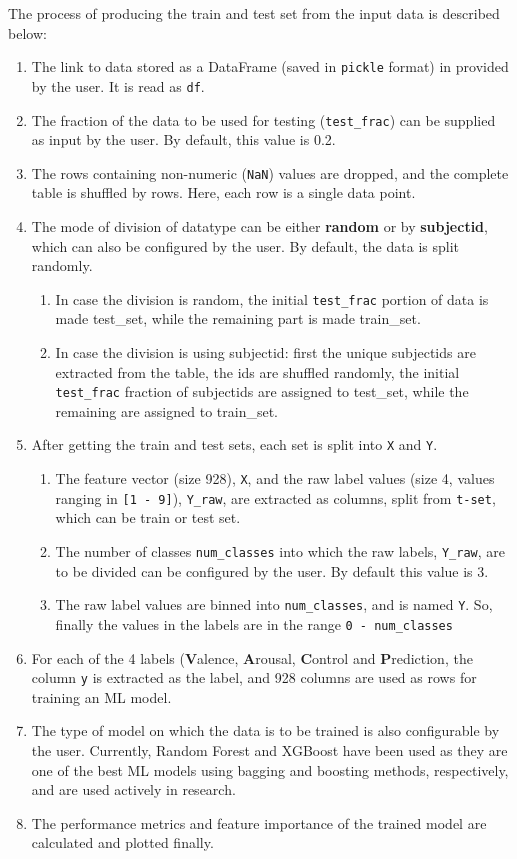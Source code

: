 The process of producing the train and test set from the input data is described below:
\begin{enumerate}
    \item The link to data stored as a DataFrame (saved in \texttt{pickle} format) in provided by the user. It is read as \texttt{df}.
    \item The fraction of the data to be used for testing (\texttt{test\_frac}) can be supplied as input by the user. By default, this value is 0.2.
    \item The rows containing non-numeric (\texttt{NaN}) values are dropped, and the complete table is shuffled by rows. Here, each row is a single data point.
    \item The mode of division of datatype can be either \textbf{random} or by \textbf{subjectid}, which can also be configured by the user. By default, the data is split randomly.
    \begin{enumerate}
        \item In case the division is random, the initial \texttt{test\_frac} portion of data is made test\_set, while the remaining part is made train\_set.
        \item In case the division is using subjectid: first the unique subjectids are extracted from the table, the ids are shuffled randomly, the initial \texttt{test\_frac} fraction of subjectids are assigned to test\_set, while the remaining are assigned to train\_set.
    \end{enumerate}
    \item After getting the train and test sets, each set is split into \texttt{X} and \texttt{Y}.
    \begin{enumerate}
        \item The feature vector (size 928), \texttt{X}, and the raw label values (size 4, values ranging in \texttt{[1 - 9]}), \texttt{Y\_raw}, are extracted as columns, split from \texttt{t-set}, which can be train or test set.
        \item The number of classes \texttt{num\_classes} into which the raw labels, \texttt{Y\_raw}, are to be divided can be configured by the user. By default this value is 3.
        \item The raw label values are binned into \texttt{num\_classes}, and is named \texttt{Y}. So, finally the values in the labels are in the range \texttt{0 - num\_classes}
    \end{enumerate}
    \item For each of the 4 labels (\textbf{V}alence, \textbf{A}rousal, \textbf{C}ontrol and \textbf{P}rediction, the column \texttt{y} is extracted as the label, and 928 columns are used as rows for training an ML model.
    \item The type of model on which the data is to be trained is also configurable by the user. Currently, Random Forest and XGBoost have been used as they are one of the best ML models using bagging and boosting methods, respectively, and are used actively in research.
    \item The performance metrics and feature importance of the trained model are calculated and plotted finally.
\end{enumerate}

